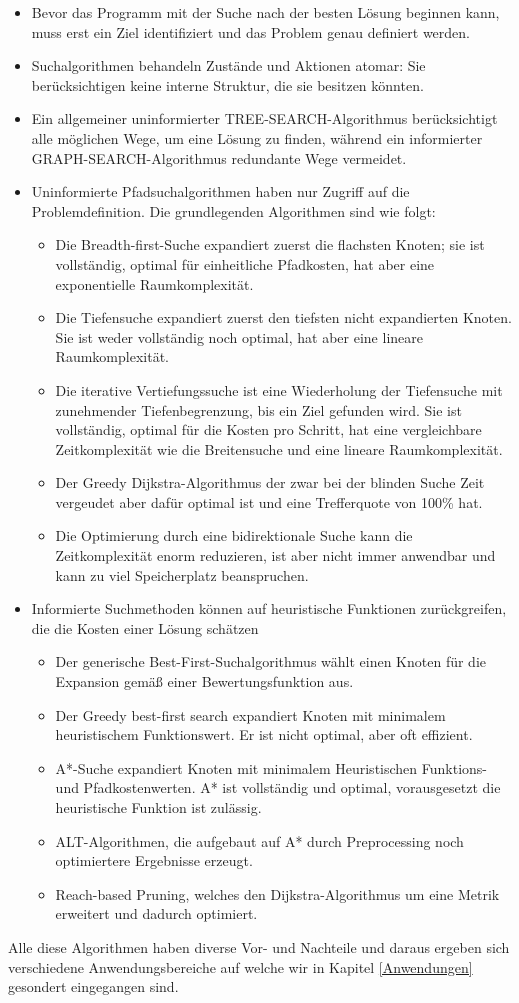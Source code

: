 \begin{itemize}
    \item Bevor das Programm mit der Suche nach der besten Lösung beginnen kann, muss erst ein Ziel identifiziert und das Problem genau definiert werden.
    \item Suchalgorithmen behandeln Zustände und Aktionen atomar: Sie berücksichtigen keine interne Struktur, die sie besitzen könnten.
    \item Ein allgemeiner uninformierter TREE-SEARCH-Algorithmus berücksichtigt alle möglichen Wege, um eine Lösung zu finden, während ein informierter GRAPH-SEARCH-Algorithmus redundante Wege vermeidet.
    \item Uninformierte Pfadsuchalgorithmen haben nur Zugriff auf die Problemdefinition. Die grundlegenden Algorithmen sind wie folgt:
    \begin{itemize}
        \item Die Breadth-first-Suche expandiert zuerst die flachsten Knoten; sie ist vollständig, optimal für einheitliche Pfadkosten, hat aber eine exponentielle Raumkomplexität.
        \item Die Tiefensuche expandiert zuerst den tiefsten nicht expandierten Knoten. Sie ist weder vollständig noch optimal, hat aber eine lineare Raumkomplexität.
        \item Die iterative Vertiefungssuche ist eine Wiederholung der Tiefensuche mit zunehmender Tiefenbegrenzung, bis ein Ziel gefunden wird. Sie ist vollständig, optimal für die Kosten pro Schritt, hat eine vergleichbare Zeitkomplexität wie die Breitensuche und eine lineare Raumkomplexität.
        \item Der Greedy Dijkstra-Algorithmus der zwar bei der blinden Suche Zeit vergeudet aber dafür optimal ist und eine Trefferquote von 100\% hat.
        \item Die Optimierung durch eine bidirektionale Suche kann die Zeitkomplexität enorm reduzieren, ist aber nicht immer anwendbar und kann zu viel Speicherplatz beanspruchen.
    \end{itemize}
    \item Informierte Suchmethoden können auf heuristische Funktionen zurückgreifen, die die Kosten einer Lösung schätzen
    \begin{itemize}
        \item Der generische Best-First-Suchalgorithmus wählt einen Knoten für die Expansion gemäß einer Bewertungsfunktion aus.
        \item Der Greedy best-first search expandiert Knoten mit minimalem heuristischem Funktionswert. Er ist nicht optimal, aber oft effizient.
        \item A*-Suche expandiert Knoten mit minimalem Heuristischen Funktions- und Pfadkostenwerten. A* ist vollständig und optimal, vorausgesetzt die heuristische Funktion ist zulässig.
        \item ALT-Algorithmen, die aufgebaut auf A* durch Preprocessing noch optimiertere Ergebnisse erzeugt.
        \item Reach-based Pruning, welches den Dijkstra-Algorithmus um eine Metrik erweitert und dadurch optimiert.
    \end{itemize}
\end{itemize}
\cite{Russell:10c}

Alle diese Algorithmen haben diverse Vor- und Nachteile und daraus ergeben sich verschiedene 
Anwendungsbereiche auf welche wir in Kapitel \ref*{Anwendungen} gesondert eingegangen sind.